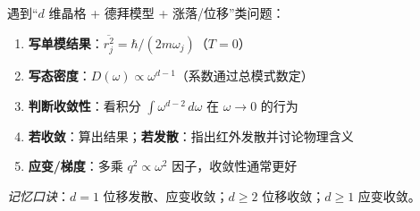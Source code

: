 \begin{thinkbox}
遇到``$d$ 维晶格 + 德拜模型 + 涨落/位移''类问题：
\begin{enumerate}
    \item \textbf{写单模结果}：$\overline{r_j^2}=\hbar/(2m\omega_j)$（$T=0$）
    \item \textbf{写态密度}：$D(\omega)\propto\omega^{d-1}$（系数通过总模式数定）
    \item \textbf{判断收敛性}：看积分 $\int\omega^{d-2}\,d\omega$ 在 $\omega\to0$ 的行为
    \item \textbf{若收敛}：算出结果；\textbf{若发散}：指出红外发散并讨论物理含义
    \item \textbf{应变/梯度}：多乘 $q^2\propto\omega^2$ 因子，收敛性通常更好
\end{enumerate}
\textit{记忆口诀}：$d=1$ 位移发散、应变收敛；$d\ge2$ 位移收敛；$d\ge1$ 应变收敛。
\end{thinkbox}
